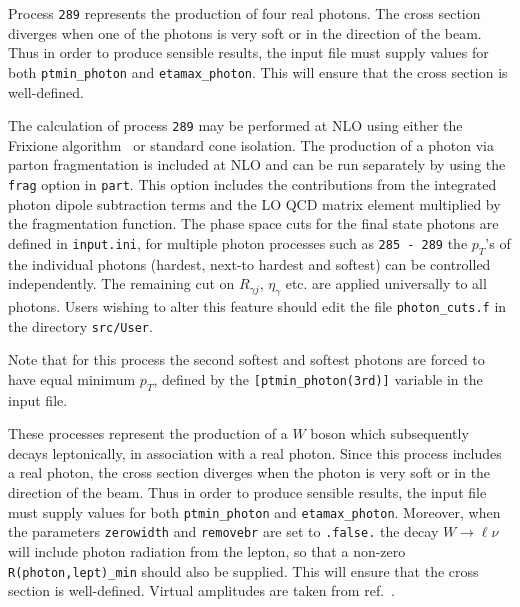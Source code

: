 \label{subsec:fourgam}

Process {\tt 289} represents the production of four real photons.
The cross section diverges
when one of the photons is very soft or in the direction of the beam.
Thus in order to produce sensible results, the input file must supply values for both
{\tt ptmin\_photon} and {\tt etamax\_photon}. This will ensure that
the cross section is well-defined.

The calculation of process {\tt 289} may be performed at NLO using either the
Frixione algorithm~\cite{Frixione:1998jh} or standard cone isolation.  The production of a photon via parton 
fragmentation is included at NLO and
can be run separately by using the {\tt frag} option in {\tt part}. This option includes the contributions from the 
integrated
photon dipole subtraction terms and the LO QCD matrix element multiplied by the fragmentation function.
The phase space cuts for the final state photons are defined in {\tt{input.ini}}, for multiple photon processes such
as {\tt 285 - 289} the $p_T$'s of the individual photons (hardest, next-to hardest and softest) can be controlled 
independently.
The remaining cut on $R_{\gamma j}$, $\eta_{\gamma}$ etc. are applied universally to all photons. Users wishing to alter
this feature should edit the file {\tt{photon\_cuts.f}} in the directory {\tt{src/User}}.

Note that for this process the second softest and softest photons are forced to have equal minimum $p_T$, defined
by the {\tt{[ptmin\_photon(3rd)]}} variable in the input file.


\label{subsec:wgamma}

These processes represent the production of a $W$ boson which subsequently
decays leptonically, in association with a real photon.
Since this process includes a real photon, the cross section diverges
when the photon is very soft or in the direction of the beam.
Thus in order to produce sensible results, the input file must supply values for both
{\tt ptmin\_photon} and {\tt etamax\_photon}. Moreover, when the parameters {\tt zerowidth}
and {\tt removebr} are set to {\tt .false.} the decay $W \to \ell \nu$ will include
photon radiation from the lepton, so that a non-zero {\tt R(photon,lept)\_min} should
also be supplied. This will ensure that the cross section is well-defined.
Virtual amplitudes are taken from ref.~\cite{Dixon:1998py}.

